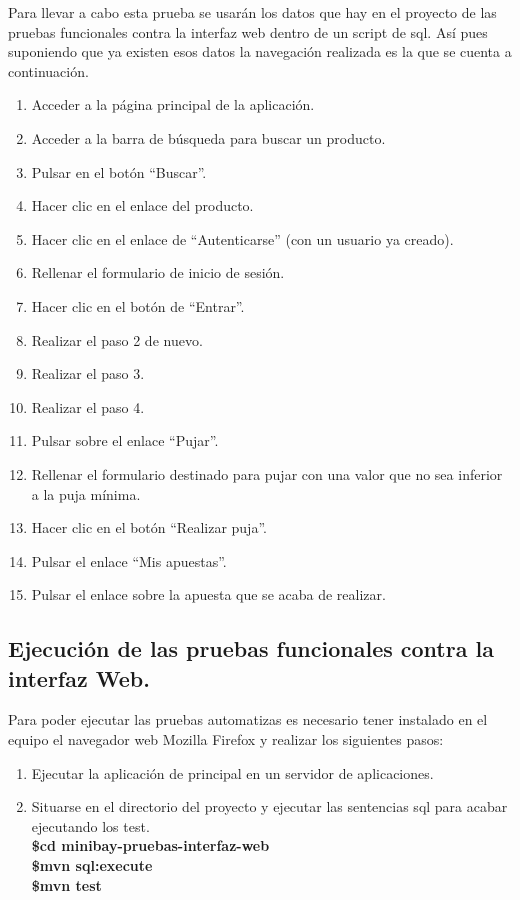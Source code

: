 \documentclass[12pt,a4paper,twoside,spanish]{article}      %
\begin{document}
	Para llevar a cabo esta prueba se usarán los datos que hay en el proyecto de las pruebas funcionales contra la interfaz web dentro de un script de sql. Así pues suponiendo que ya existen esos datos la navegación realizada es la que se cuenta a continuación.
\begin{enumerate}
	\item Acceder a la página principal de la aplicación.
	\item Acceder a la barra de búsqueda para buscar un producto.
	\item Pulsar en el botón ``Buscar''.
	\item Hacer clic en el enlace del producto.
	\item Hacer clic en el enlace de ``Autenticarse'' (con un usuario ya creado).
	\item Rellenar el formulario de inicio de sesión.
	\item Hacer clic en el botón de ``Entrar''.
	\item Realizar el paso 2 de nuevo.
	\item Realizar el paso 3.
	\item Realizar el paso 4.
	\item Pulsar sobre el enlace ``Pujar''.
	\item Rellenar el formulario destinado para pujar con una valor que no sea inferior a la puja mínima.
	\item Hacer clic en el botón ``Realizar puja''.
	\item Pulsar el enlace ``Mis apuestas''.
	\item Pulsar el enlace sobre la apuesta que se acaba de realizar.
\end{enumerate}

\subsection{Ejecución de las pruebas funcionales contra la interfaz Web.}

	Para poder ejecutar las pruebas automatizas es necesario tener instalado en el equipo el navegador web Mozilla Firefox y realizar los siguientes pasos:
\begin{enumerate}
	\item Ejecutar la aplicación de principal en un servidor de aplicaciones.
	\item Situarse en el directorio del proyecto y ejecutar las sentencias sql para acabar ejecutando los test.\\
	\textbf{\$cd minibay-pruebas-interfaz-web} \\
	\textbf{\$mvn sql:execute} \\
	\textbf{\$mvn test}        \\
	
\end{enumerate}
\end{document}
